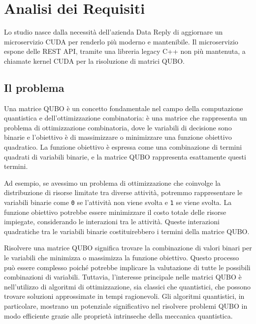 \chapter{Analisi dei Requisiti}
\label{sec:requirements}


Lo studio nasce dalla necessità dell'azienda Data Reply di aggiornare un microservizio CUDA per renderlo più moderno e mantenibile. Il microservizio espone delle REST API, tramite una libreria legacy C++ non più mantenuta, a chiamate kernel CUDA per la risoluzione di matrici QUBO. 


\section{Il problema}

Una matrice QUBO è un concetto fondamentale nel campo della computazione quantistica e dell'ottimizzazione combinatoria: è una matrice che rappresenta un problema di ottimizzazione combinatoria, dove le variabili di decisione sono binarie e l'obiettivo è di massimizzare o minimizzare una funzione obiettivo quadratico. La funzione obiettivo è espressa come una combinazione di termini quadrati di variabili binarie, e la matrice QUBO rappresenta esattamente questi termini. 

Ad esempio, se avessimo un problema di ottimizzazione che coinvolge la distribuzione di risorse limitate tra diverse attività, potremmo rappresentare le variabili binarie come \verb|0| se l'attività non viene svolta e \verb|1| se viene svolta. La funzione obiettivo potrebbe essere minimizzare il costo totale delle risorse impiegate, considerando le interazioni tra le attività. Queste interazioni quadratiche tra le variabili binarie costituirebbero i termini della matrice QUBO. 

Risolvere una matrice QUBO significa trovare la combinazione di valori binari per le variabili che minimizza o massimizza la funzione obiettivo. Questo processo può essere complesso poiché potrebbe implicare la valutazione di tutte le possibili combinazioni di variabili. Tuttavia, l'interesse principale nelle matrici QUBO è nell'utilizzo di algoritmi di ottimizzazione, sia classici che quantistici, che possono trovare soluzioni approssimate in tempi ragionevoli. Gli algoritmi quantistici, in particolare, mostrano un potenziale significativo nel risolvere problemi QUBO in modo efficiente grazie alle proprietà intrinseche della meccanica quantistica.

